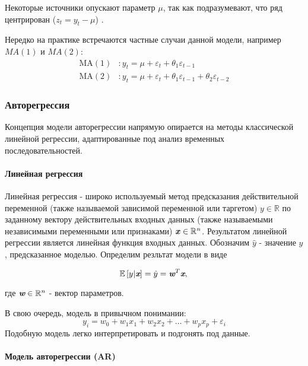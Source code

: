 Некоторые источники опускают параметр $\mu$, так как подразумевают, что ряд 
центрирован ($z_t = y_t - \mu$) \cite{TSA_Box}.

Нередко на практике встречаются частные случаи данной модели, например $MA(1)$ и 
$MA(2)$:
\begin{align*}
    \text{MA}(1) &: y_t = \mu + \varepsilon_t + \theta_1 \varepsilon_{t-1} \\
    \text{MA}(2) &: y_t = \mu + \varepsilon_t + \theta_1 \varepsilon_{t-1} + \theta_2 \varepsilon_{t-2}
\end{align*}

\subsubsection{Авторегрессия}

Концепция модели авторегрессии напрямую опирается 
на методы классической линейной регрессии, адаптированные под 
анализ временных последовательностей.

\paragraph{Линейная регрессия}

Линейная регрессия - широко используемый метод предсказания действительной 
переменной (также называемой зависимой переменной или таргетом) $y \in \mathbb{R}$ 
по заданному вектору действительных входных данных (также называемыми 
независимыми переменными или признаками) $\textbf{\textit{x}} \in \mathbb{R}^n$. Результатом 
линейной регрессии является линейная функция входных данных. Обозначим $\hat{y}$ - 
значение $y$, предсказанное моделью. Определим резльтат модели в виде

\begin{equation*}
    \mathbb{E} \left[ y | \textit{\textbf{x}} \right] = \hat{y} = 
    \textit{\textbf{w}}^T \textit{\textbf{x}}, \\
\end{equation*}

где $\textit{\textbf{w}} \in \mathbb{R}^n$ - вектор параметров. 

В свою очередь, модель в привычном понимании:
\begin{equation*}
    y_i = w_0 + w_1 x_1 + w_2 x_2 + \dots + w_p x_p + \varepsilon_i
\end{equation*}
Подобную модель легко интерпретировать и подгонять под данные.

\paragraph{Модель авторегрессии (AR)}

